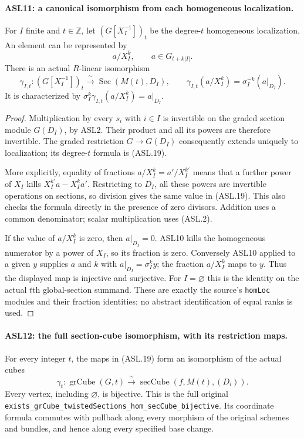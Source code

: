 \documentclass[11pt,a4paper]{article}
\numberwithin{equation}{section}
\theoremstyle{remark}\newtheorem{remark}[theorem]{Remark}
\begin{document}
\paragraph{ASL11: a canonical isomorphism from each homogeneous localization.}
\label{claim:ASL11}
For $I$ finite and $t\in\mathbb Z$, let $(G[X_I^{-1}])_t$
be the degree-$t$ homogeneous localization.  An element can be
represented by
\[
       a/X_I^k,\qquad a\in G_{t+k|I|}.
\]
There is an actual $R$-linear isomorphism
\[
 \gamma_{I,t}:(G[X_I^{-1}])_t
                 \xrightarrow{\ \sim\ }
                       \operatorname{Sec}(M(t),D_I),
 \qquad \gamma_{I,t}(a/X_I^k)=\sigma_I^{-k}(a|_{D_I}).
                                                        \tag{ASL.19}
\]
It is characterized by
$\sigma_I^k\gamma_{I,t}(a/X_I^k)=a|_{D_I}$.

\begin{proof}
Multiplication by every $s_i$ with $i\in I$ is invertible on
the graded section module $G(D_I)$, by ASL2.  Their product
and all its powers are therefore invertible.  The graded
restriction $G\to G(D_I)$ consequently extends uniquely to
localization; its degree-$t$ formula is (ASL.19).

More explicitly, equality of fractions $a/X_I^k=a'/X_I^{k'}$
means that a further power of $X_I$ kills
$X_I^{k'}a-X_I^ka'$.  Restricting to $D_I$, all these powers
are invertible operations on sections, so division gives the same
value in (ASL.19).  This also checks the formula directly in the
presence of zero divisors.  Addition uses a common denominator;
scalar multiplication uses (ASL.2).

If the value of $a/X_I^k$ is zero, then $a|_{D_I}=0$.
ASL10 kills the homogeneous numerator by a power of $X_I$,
so its fraction is zero.  Conversely ASL10 applied to a given
$y$ supplies $a$ and $k$ with $a|_{D_I}=\sigma_I^ky$;
the fraction $a/X_I^k$ maps to $y$.  Thus the displayed map
is injective and surjective.  For $I=\varnothing$ this is the
identity on the actual $t$th global-section summand.  These
are exactly the source's \texttt{hom\allowbreak{}Loc} modules and their
fraction identities; no abstract identification of equal ranks is used.
\end{proof}

\paragraph{ASL12: the full section-cube isomorphism, with its restriction maps.}
\label{claim:ASL12}
For every integer $t$, the maps in (ASL.19) form an isomorphism
of the actual cubes
\[
 \gamma_t:\operatorname{grCube}(G,t)
              \xrightarrow{\ \sim\ }
                  \operatorname{secCube}(f,M(t),(D_i)).
                                                        \tag{ASL.20}
\]
Every vertex, including $\varnothing$, is bijective.  This is
the full original
\texttt{exists\_\allowbreak{}gr\allowbreak{}Cube\_\allowbreak{}twisted\allowbreak{}Sections\_\allowbreak{}hom\_\allowbreak{}sec\allowbreak{}Cube\_\allowbreak{}bijective}.
Its coordinate formula commutes with pullback along every morphism
of the original schemes and bundles, and hence along every
specified base change.
\end{document}
